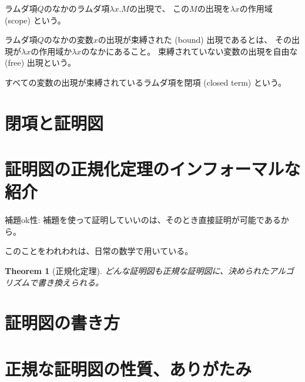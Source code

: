 \documentclass[fleqn]{jsarticle}
\newtheorem{theo}{Theorem}
\begin{document}
ラムダ項$Q$のなかのラムダ項$\lambda x. M$の出現で、
この$M$の出現を$\lambda x$の作用域 (scope) という。

ラムダ項$Q$のなかの変数$x$の出現が束縛された (bound) 出現であるとは、
その出現が$\lambda x$の作用域か$\lambda x$のなかにあること。
束縛されていない変数の出現を自由な (free) 出現という。

すべての変数の出現が束縛されているラムダ項を閉項 (closed term) という。


\section{閉項と証明図}


\section{証明図の正規化定理のインフォーマルな紹介}

補題ok性: 補題を使って証明していいのは、そのとき直接証明が可能であるから。

このことをわれわれは、日常の数学で用いている。



\begin{theo}[正規化定理]
 どんな証明図も正規な証明図に、決められたアルゴリズムで書き換えられる。
\end{theo}

\section{証明図の書き方}


\section{正規な証明図の性質、ありがたみ}
\end{document}
